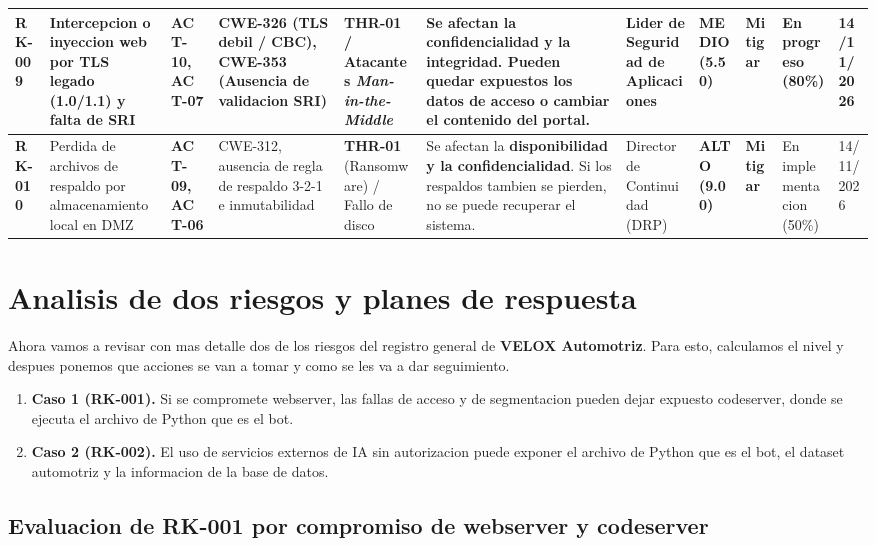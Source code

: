 \documentclass[letterpaper,11pt]{article}
\begin{document}
\begin{longtable}{|C{0.80cm}|L{1.58cm}|L{1.20cm}|L{1.92cm}|L{1.65cm}|L{1.70cm}|L{1.70cm}|C{1.35cm}|C{1.30cm}|C{1.35cm}|C{1.35cm}|}
\textbf{RK-009}
  & Intercepcion o inyeccion web por TLS legado (1.0/1.1) y falta de
SRI
  & \textbf{ACT-10, ACT-07}
  & CWE-326 (TLS debil / CBC), CWE-353 (Ausencia de validacion SRI)
  & \textbf{THR-01} / Atacantes \textit{Man-in-the-Middle}
  & Se afectan la \textbf{confidencialidad y la integridad}. Pueden
quedar expuestos los datos de acceso o cambiar el contenido del
portal.
  & Lider de Seguridad de Aplicaciones
  & \textbf{MEDIO (5.50)}
  & \textbf{Mitigar}
  & En progreso (80\%)
  & 14/11/2026 \\
\hline

\textbf{RK-010}
  & Perdida de archivos de respaldo por almacenamiento local en DMZ
  & \textbf{ACT-09, ACT-06}
  & CWE-312, ausencia de regla de respaldo 3-2-1 e inmutabilidad
  & \textbf{THR-01} (Ransomware) / Fallo de disco
  & Se afectan la \textbf{disponibilidad y la confidencialidad}. Si los
respaldos tambien se pierden, no se puede recuperar el sistema.
  & Director de Continuidad (DRP)
  & \textbf{ALTO (9.00)}
  & \textbf{Mitigar}
  & En implementacion (50\%)
  & 14/11/2026 \\
\hline
\end{longtable}
\endgroup

\newpage
\section{Analisis de dos riesgos y planes de respuesta}

Ahora vamos a revisar con mas detalle dos de los riesgos del
registro general de \textbf{VELOX Automotriz}. Para esto, calculamos
el nivel y despues ponemos que acciones se van a tomar y como se les
va a dar seguimiento.
\begin{enumerate}[noitemsep,topsep=2pt]
    \item \textbf{Caso 1 (RK-001).} Si se compromete webserver, las fallas de acceso y de segmentacion pueden dejar expuesto codeserver, donde se ejecuta el archivo de Python que es el bot.
    \item \textbf{Caso 2 (RK-002).} El uso de servicios externos de IA sin autorizacion puede exponer el archivo de Python que es el bot, el dataset automotriz y la informacion de la base de datos.
\end{enumerate}

\subsection{Evaluacion de RK-001 por compromiso de webserver y
codeserver}
\end{document}
